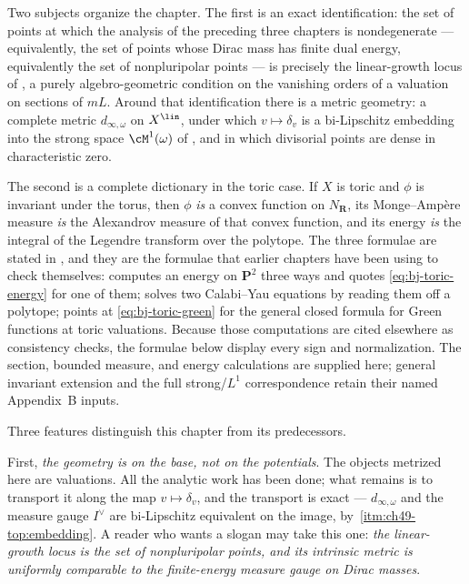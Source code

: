 Two subjects organize the chapter.  The first is an exact identification: the set of
points at which the analysis of the preceding three chapters is
nondegenerate --- equivalently, the set of points whose Dirac mass has
finite dual energy, equivalently the set of nonpluripolar points --- is
precisely the linear-growth locus of , a purely
algebro-geometric condition on the vanishing orders of a valuation on
sections of $mL$.  Around that identification there is a
metric geometry: a complete metric $d_{\infty,\omega}$ on $X^{\lin}$,
under which $v\mapsto\delta_v$ is a bi-Lipschitz embedding into the
strong space $\cM^1(\omega)$ of , and in
which divisorial points are dense in characteristic zero.

The second is a complete dictionary in the toric case.  If $X$ is toric
and $\phi$ is invariant under the torus, then $\phi$ \emph{is} a convex
function on $N_{\mathbf R}$, its Monge--Amp\`ere measure \emph{is} the
Alexandrov measure of that convex function, and its energy \emph{is} the
integral of the Legendre transform over the polytope.  The three formulae
are stated in , and
they are the formulae that earlier chapters have been using to check
themselves:  computes an energy on $\mathbf P^2$
three ways and quotes \eqref{eq:bj-toric-energy} for one of them;
 solves two Calabi--Yau equations by reading them
off a polytope;  points at
\eqref{eq:bj-toric-green} for the general closed formula for Green functions at toric valuations.  Because those computations are cited elsewhere as
consistency checks, the formulae below display every sign and normalization.
The section, bounded measure, and energy calculations are supplied here;
general invariant extension and the full strong/$L^1$ correspondence
retain their named Appendix~B inputs.

Three features distinguish this chapter from its predecessors.

First, \emph{the geometry is on the base, not on the potentials}.  The
objects metrized here are valuations.  All the analytic work has been done;
what remains is to transport it along the map $v\mapsto\delta_v$, and the
transport is exact --- $d_{\infty,\omega}$ and the measure gauge
$I^\vee$ are bi-Lipschitz equivalent on the image, by
\,\cref{itm:ch49-top:embedding}.  A
reader who wants a slogan may take this one: \emph{the linear-growth locus
is the set of nonpluripolar points, and its intrinsic metric is uniformly
comparable to the finite-energy measure gauge on Dirac masses}.

